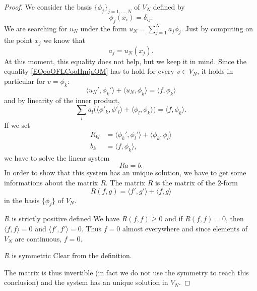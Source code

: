 \begin{proof}
    We consider the basis \( \{ \phi_j \}_{j=1,\ldots, N}\) of \( V_N\) defined by
    \begin{equation}
        \phi_j(x_i)=\delta_{ij}.
    \end{equation}
    We are searching for \( u_N\) under the form \( u_N=\sum_{j=1}^Na_j\phi_j\). Just by computing on the point \( x_j\) we know that
    \begin{equation}
        a_j=u_N(x_j).
    \end{equation}
    At this moment, this equality does not help, but we keep it in mind. Since the equality \eqref{EQooOFLCooHmjaOM} has to hold for every \( v \in V_N\), it holds in particular for \( v=\phi_k\):
    \begin{equation}
        \langle u_N', \phi_k'\rangle +\langle u_N, \phi_k\rangle =\langle f, \phi_k\rangle
    \end{equation}
    and by linearity of the inner product,
    \begin{equation}
        \sum_la_l\big( \langle \phi'_k, \phi'_l\rangle +\langle \phi_l, \phi_k\rangle  \big)=\langle f, \phi_k\rangle .
    \end{equation}
    If we set
    \begin{subequations}
        \begin{align}
            R_{kl}&=\langle \phi_k', \phi_l'\rangle +\langle \phi_k, \phi_l\rangle \\
            b_k&=\langle f, \phi_k\rangle,
        \end{align}
    \end{subequations}
    we have to solve the linear system
    \begin{equation}
        Ra=b.
    \end{equation}
    In order to show that this system has an unique solution, we have to get some informations about the matrix \( R\). The matrix \( R\) is the matrix of the \( 2\)-form
    \begin{equation}
        R(f,g)=\langle f', g'\rangle +\langle f, g\rangle
    \end{equation}
    in the basis \( \{ \phi_j \}\) of \( V_N\).

    \begin{subproof}
        \item[\( R\) is strictly positive defined]
            We have \( R(f,f)\geq 0\) and if \( R(f,f)=0\), then \( \langle f, f\rangle =0\) and \( \langle f', f'\rangle =0\). Thus \( f=0\) almost everywhere and since elements of \( V_N\) are continuous, \( f=0\).
        \item[\( R\) is symmetric] Clear from the definition.
    \end{subproof}

    The matrix is thus invertible (in fact we do not use the symmetry to reach this conclusion) and the system has an unique solution in \( V_N\).

\end{proof}

